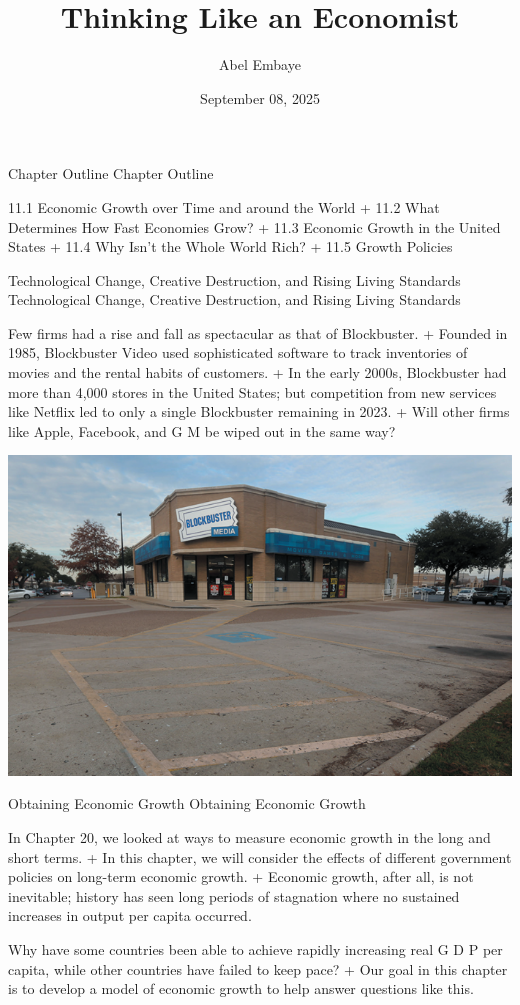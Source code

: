 \documentclass[
  12pt,
  ignorenonframetext,
]{beamer}
\title{Thinking Like an Economist}
\author{Abel Embaye}
\date{September 08, 2025}
\institute{Department of Economics\\
\strut \\
UofA\\}
\begin{document}
\frame{\titlepage}

\begin{frame}{Chapter Outline}
\protect\hypertarget{chapter-outline}{}
Chapter Outline

11.1 Economic Growth over Time and around the World + 11.2 What
Determines How Fast Economies Grow? + 11.3 Economic Growth in the United
States + 11.4 Why Isn't the Whole World Rich? + 11.5 Growth Policies
\end{frame}

\begin{frame}{Technological Change, Creative Destruction, and Rising
Living Standards}
\protect\hypertarget{technological-change-creative-destruction-and-rising-living-standards}{}
Technological Change, Creative Destruction, and Rising Living Standards

Few firms had a rise and fall as spectacular as that of Blockbuster. +
Founded in 1985, Blockbuster Video used sophisticated software to track
inventories of movies and the rental habits of customers. + In the early
2000s, Blockbuster had more than 4,000 stores in the United States; but
competition from new services like Netflix led to only a single
Blockbuster remaining in 2023. + Will other firms like Apple, Facebook,
and G M be wiped out in the same way?

\includegraphics[width=\textwidth,height=0.99\textheight]{imgs3/img_slide03a.png}
\end{frame}

\begin{frame}{Obtaining Economic Growth}
\protect\hypertarget{obtaining-economic-growth}{}
Obtaining Economic Growth

In Chapter 20, we looked at ways to measure economic growth in the long
and short terms. + In this chapter, we will consider the effects of
different government policies on long-term economic growth. + Economic
growth, after all, is not inevitable; history has seen long periods of
stagnation where no sustained increases in output per capita occurred.

Why have some countries been able to achieve rapidly increasing real G D
P per capita, while other countries have failed to keep pace? + Our goal
in this chapter is to develop a model of economic growth to help answer
questions like this.
\end{frame}
\end{document}
